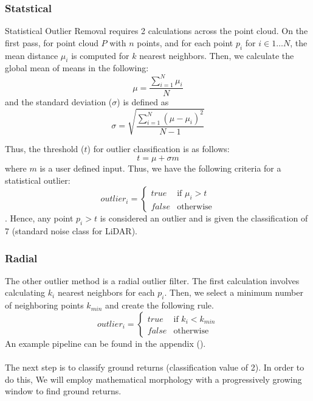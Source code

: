 \documentclass[11pt]{article}
\theoremstyle{definition}
\begin{document}
\subsubsection{Statstical}\label{subsub:stat}
Statistical Outlier Removal requires 2 calculations across the point cloud.  On the first pass, for point cloud $P$ with $n$ points, and for each point $p_i$ for $i\in 1 \ldots N$, the mean distance $\mu_i$ is computed for $k$ nearest neighbors.  Then, we calculate the global mean of means in the following:
\begin{equation}\label{eqn:average} 
\mu=\dfrac{\sum_{i=1}^{N} \mu_{i}}{N} 
\end{equation}
and the standard deviation ($\sigma$) is defined as
\begin{equation}\label{eqn:std} 
\sigma=\sqrt{\dfrac{\sum_{i=1}^{N} (\mu-\mu_{i})^2}{N-1}} 
\end{equation}

Thus, the threshold ($t$) for outlier classification is as follows:
\begin{equation}\label{eqn:threshold}
t=\mu+\sigma m
\end{equation}
where $m$ is a user defined input.  Thus, we have the following criteria for a statistical outlier:
\begin{equation}\label{eqn:stat_rule}
outlier_{i}=\begin{cases}
true & \text{if $\mu_{i}>t$}\\
false & \text{otherwise}
\end{cases}
\end{equation}.  
Hence, any point $p_i > t$ is considered an outlier and is given the classification of 7 (standard noise class for LiDAR).
\subsubsection{Radial}\label{subsub:radial}
The other outlier method is a radial outlier filter.  The first calculation involves calculating $k_i$ nearest neighbors for each $p_i$.  Then, we select a minimum number of neighboring points $k_{min}$ and create the following rule.  
\begin{equation}\label{eqn:rad_rule}
outlier_{i}=\begin{cases}
true & \text{if $k_{i}<k_{min}$}\\
false & \text{otherwise}
\end{cases}
\end{equation}
An example pipeline can be found in the appendix ().\\\\
The next step is to classify ground returns (classification value of 2).  In order to do this, We will employ mathematical morphology with a progressively growing window to find ground returns.  
\end{document}
